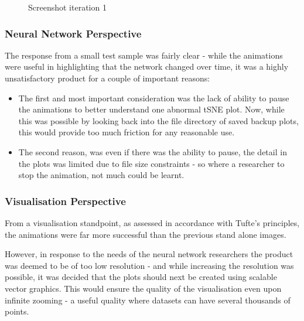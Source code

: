 \documentclass[a4paper,11pt,titlepage]{article}
\begin{document}
	\begin{figure}[H]
    			\caption{Screenshot iteration 1}%
	\end{figure}		
	
		\subsubsection{Neural Network Perspective}
		The response from a small test sample was fairly clear - while the animations were useful in highlighting that the network changed over time, it was a highly unsatisfactory product for a couple of important reasons: 
		\begin{itemize}
			\item The first and most important consideration was the lack of ability to pause the animations to better understand one abnormal tSNE plot. Now, while this was possible by looking back into the file directory of saved backup plots, this would provide too much friction for any reasonable use.
			\item The second reason, was even if there was the ability to pause, the detail in the plots was limited due to file size constraints - so where a researcher to stop the animation, not much could be learnt.
		\end{itemize}
		
		\subsubsection{Visualisation Perspective}
		From a visualisation standpoint, as assessed in accordance with Tufte's principles, the animations were far more successful than the previous stand alone images.
		\par 
		However, in response to the needs of the neural network researchers the product was deemed to be of too low resolution - and while increasing the resolution was possible, it was decided that the plots should next be created using scalable vector graphics. This would ensure the quality of the visualisation even upon infinite zooming - a useful quality where datasets can have several thousands of points. 
\end{document}
